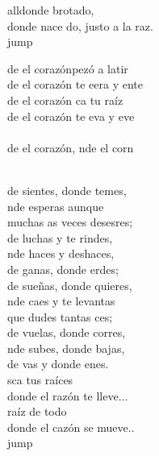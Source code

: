 \begin{cancion}
	alldonde brotado,\\
	donde nace do, justo a la raz.\\jump\\
	\begin{chorus}%
	de el corazónpezó a latir  \\
	de el corazón te eera y ente  \\
	de el corazón ca tu raíz  \\
	de el corazón te eva y eve  \\
{}\vspace*{-0.4cm}\\
	de el corazón, nde el corn  \\
	\end{chorus}%
	\jump\\
	de sientes, donde temes,  \\
	nde esperas aunque \\
	muchas as veces desesres; \\
	de luchas y te rindes, \\
	nde haces y deshaces,\\
	de ganas, donde erdes;\\
	de sueñas, donde quieres, \\
	nde caes y te levantas\\
	que dudes tantas ces; \\
	de vuelas, donde corres,\\
	nde subes, donde bajas, \\
	de vas y donde enes. \\
	sca tus raíces \\
	donde el razón te lleve... \\
	 raíz de todo \\
	donde el cazón se mueve.. \\jump\\

\end{cancion}
